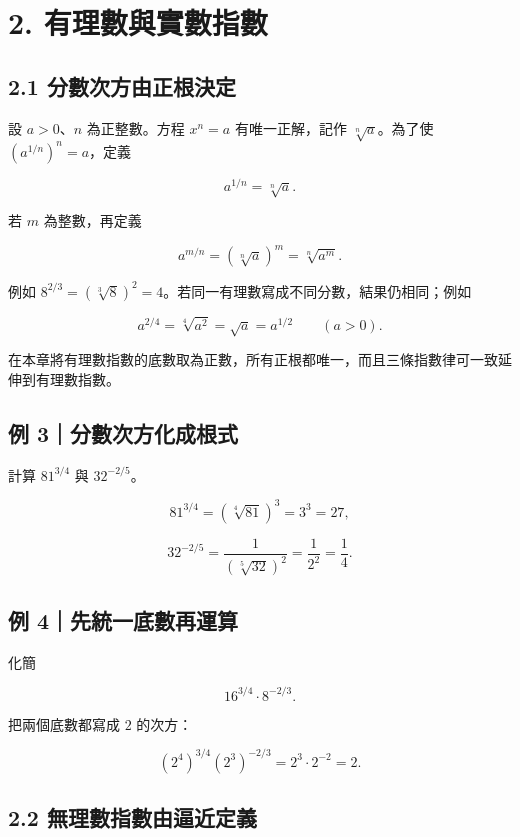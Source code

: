 \documentclass[11pt,a4paper]{article}
\begin{document}
\section{2. 有理數與實數指數}\label{ux6709ux7406ux6578ux8207ux5be6ux6578ux6307ux6578}

\subsection{2.1 分數次方由正根決定}\label{ux5206ux6578ux6b21ux65b9ux7531ux6b63ux6839ux6c7aux5b9a}

設 \(a>0\)、\(n\) 為正整數。方程 \(x^n=a\) 有唯一正解，記作 \(\sqrt[n]{a}\)。為了使 \((a^{1/n})^n=a\)，定義

\[
\boxed{a^{1/n}=\sqrt[n]{a}}.
\]

若 \(m\) 為整數，再定義

\[
\boxed{a^{m/n}=\left(\sqrt[n]{a}\right)^m=\sqrt[n]{a^m}}.
\]

例如 \(8^{2/3}=(\sqrt[3]{8})^2=4\)。若同一有理數寫成不同分數，結果仍相同；例如

\[
a^{2/4}=\sqrt[4]{a^2}=\sqrt a=a^{1/2}\qquad(a>0).
\]

在本章將有理數指數的底數取為正數，所有正根都唯一，而且三條指數律可一致延伸到有理數指數。

\subsection{例 3｜分數次方化成根式}\label{ux4f8b-3ux5206ux6578ux6b21ux65b9ux5316ux6210ux6839ux5f0f}

計算 \(81^{3/4}\) 與 \(32^{-2/5}\)。

\[
81^{3/4}=(\sqrt[4]{81})^3=3^3=\boxed{27},
\]

\[
32^{-2/5}=\frac1{(\sqrt[5]{32})^2}=\frac1{2^2}=\boxed{\frac14}.
\]

\subsection{例 4｜先統一底數再運算}\label{ux4f8b-4ux5148ux7d71ux4e00ux5e95ux6578ux518dux904bux7b97}

化簡

\[
16^{3/4}\cdot8^{-2/3}.
\]

把兩個底數都寫成 \(2\) 的次方：

\[
(2^4)^{3/4}(2^3)^{-2/3}
=2^3\cdot2^{-2}=\boxed2.
\]

\subsection{2.2 無理數指數由逼近定義}\label{ux7121ux7406ux6578ux6307ux6578ux7531ux903cux8fd1ux5b9aux7fa9}
\end{document}
